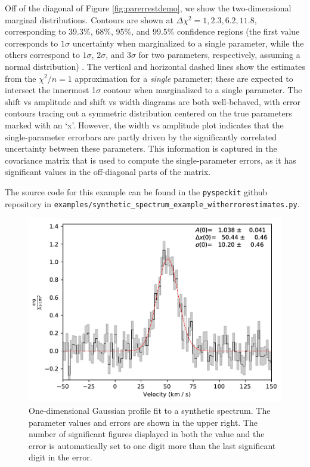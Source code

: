 \documentclass[twocolumn]{aastex63}
\newcommand{\pyspeckit}{\texttt{pyspeckit}\xspace}
\begin{document}
Off of the diagonal of Figure \ref{fig:parerrestdemo}, we show the
two-dimensional marginal distributions.  Contours
are shown at
$\Delta\chi^2=1,2.3,6.2,11.8$, corresponding to 39.3\%, 68\%, 95\%, and 99.5\%
confidence regions
(the first value corresponds to $1\sigma$ uncertainty when marginalized to a single parameter, while the others correspond to $1\sigma$, $2\sigma$, and
$3\sigma$ for two parameters, respectively, assuming a normal
distribution) .  The
vertical and horizontal dashed lines show the estimates from the $\chi^2/n=1$
approximation for a \emph{single} parameter; these are  expected to intersect
the innermost 1$\sigma$ contour  when marginalized to a single parameter. 
The shift vs amplitude and shift vs width diagrams are both well-behaved, with error
contours tracing out a symmetric distribution centered on the true parameters marked
with an `x'.
However, the width vs amplitude plot indicates that the single-parameter
errorbars %
are partly driven by the significantly correlated uncertainty between 
these parameters.
This information is captured in the covariance
matrix that is used to compute the single-parameter errors, as it has
significant values in the off-diagonal parts of the matrix.  

The source code for this example can be found in the \pyspeckit github
repository in \texttt{examples/synthetic\_spectrum\_example\_witherrorestimates.py}.

\begin{figure}[!htp]
\includegraphics[scale=1,width=7in]{oned_gaussfit_example.pdf}
\caption{One-dimensional Gaussian profile fit to a synthetic spectrum.
The parameter values and errors are shown in the upper right.  The number of
significant figures displayed in both the value and the error is automatically
set to one digit more than the last significant digit in the error.}
\label{fig:synthspecdemo}
\end{figure}
\end{document}
